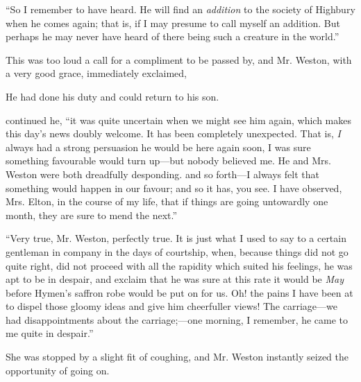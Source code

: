 
“So I remember to have heard. He will find an {\em addition} to the society of Highbury when he comes again; that is, if I may presume to call myself an addition. But perhaps he may never have heard of there being such a creature in the world.”

This was too loud a call for a compliment to be passed by, and Mr. Weston, with a very good grace, immediately exclaimed,


He had done his duty and could return to his son.

 continued he, “it was quite uncertain when we might see him again, which makes this day's news doubly welcome. It has been completely unexpected. That is, {\em I} always had a strong persuasion he would be here again soon, I was sure something favourable would turn up---but nobody believed me. He and Mrs. Weston were both dreadfully desponding.  and so forth---I always felt that something would happen in our favour; and so it has, you see. I have observed, Mrs. Elton, in the course of my life, that if things are going untowardly one month, they are sure to mend the next.”

“Very true, Mr. Weston, perfectly true. It is just what I used to say to a certain gentleman in company in the days of courtship, when, because things did not go quite right, did not proceed with all the rapidity which suited his feelings, he was apt to be in despair, and exclaim that he was sure at this rate it would be {\em May} before Hymen's saffron robe would be put on for us. Oh! the pains I have been at to dispel those gloomy ideas and give him cheerfuller views! The carriage---we had disappointments about the carriage;---one morning, I remember, he came to me quite in despair.”

She was stopped by a slight fit of coughing, and Mr. Weston instantly seized the opportunity of going on.

